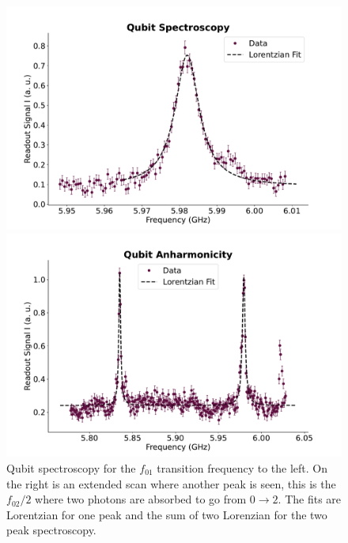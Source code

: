 \begin{figure}[t]
    \caption{Qubit spectroscopy for the $f_{01}$ transition frequency to the left. On the right is an extended scan where another peak is seen, this is the $f_{02}/2$ where two photons are absorbed to go from $ 0 \to 2$. The fits are Lorentzian for one peak and the sum of two Lorenzian for the two peak spectroscopy. }
    \begin{minipage}{0.50\linewidth}
        \centering
        \includegraphics[width=1.0\linewidth]{Calibrations/Figures/Qubit Spectroscopy.pdf} %
    \end{minipage}
    \begin{minipage}{0.50\linewidth}
        \centering
        \includegraphics[width=1.0\linewidth]{Calibrations/Figures/Qubit Anharmonicity.pdf} %
    \end{minipage}
    \label{fig:qubit_spectroscopy}
\end{figure}

